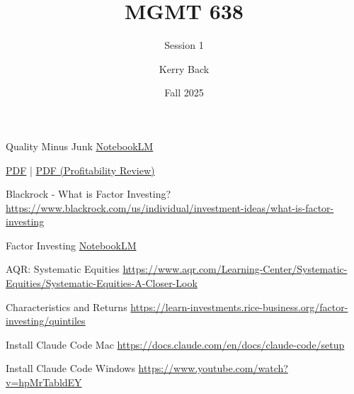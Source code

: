 \documentclass[aspectratio=169]{beamer}
\title{MGMT 638}
\subtitle{Session 1}
\author{Kerry Back}
\institute{}
\date{Fall 2025}
\begin{document}
\maketitle

\begin{frame}{Quality Minus Junk}
\centering
\Large
\href{https://notebooklm.google.com/notebook/622b8be3-c430-450d-8d78-7a7841e3a02b}{NotebookLM}

\vspace{1em}

\href{https://mgmt638.kerryback.com/Asness_Frazzini_Pedersen_RAS_2019.pdf}{PDF} | \href{https://mgmt638.kerryback.com/Novy-Marx_Medhat_2025.pdf}{PDF (Profitability Review)}
\end{frame}

\begin{frame}{Blackrock - What is Factor Investing?}
\centering
\Large
\url{https://www.blackrock.com/us/individual/investment-ideas/what-is-factor-investing}
\end{frame}

\begin{frame}{Factor Investing}
\centering
\Large
\href{https://notebooklm.google.com/notebook/a2829f9c-2a21-420b-9d89-5846a579b266}{NotebookLM}
\end{frame}

\begin{frame}{AQR: Systematic Equities}
\centering
\Large
\url{https://www.aqr.com/Learning-Center/Systematic-Equities/Systematic-Equities-A-Closer-Look}
\end{frame}

\begin{frame}{Characteristics and Returns}
\centering
\Large
\url{https://learn-investments.rice-business.org/factor-investing/quintiles}
\end{frame}

\begin{frame}{Install Claude Code Mac}
\centering
\Large
\url{https://docs.claude.com/en/docs/claude-code/setup}
\end{frame}

\begin{frame}{Install Claude Code Windows}
\centering
\Large
\url{https://www.youtube.com/watch?v=hpMrTabldEY}
\end{frame}
\end{document}

